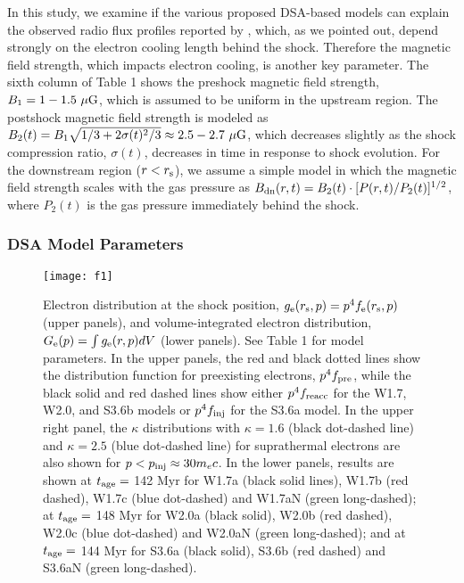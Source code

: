 \documentclass[twocolumn]{aastex61}
\def\muG{~{\mu\rm G}}
\begin{document}
In this study, we examine if the various proposed DSA-based models can explain the observed radio flux profiles reported by \citet{vanweeren16}, 
which, as we pointed out, depend strongly on the electron cooling length behind the shock. Therefore the magnetic field strength, which impacts electron cooling, is another key parameter.
The sixth column of Table 1 shows the preshock magnetic field strength, $B_1=1-1.5 \muG$,
which is assumed to be uniform in the upstream region.
The postshock magnetic field strength is modeled as $B_2(t)=B_1 \sqrt{1/3+2\sigma(t)^2/3}\approx 2.5-2.7\muG$,
which decreases slightly as the shock compression ratio, $\sigma(t)$, decreases in time in response to shock evolution.
For the downstream region ($r<r_{\rm s}$), we assume a simple model in which the magnetic field strength scales with the 
gas pressure as $B_{\rm dn}(r,t)= B_2(t) \cdot [P(r,t)/P_{2}(t)]^{1/2}$,
where $P_{2}(t)$ is the gas pressure immediately behind the shock.

\subsubsection{DSA Model Parameters}

\begin{figure*}[t]
\vspace{-0.4cm}
\hspace{-0.2cm}
\texttt{[image: f1]}
\vspace{-7.0cm}
\caption{
Electron distribution at the shock position, $g_{\rm e}(r_{\rm s},p)=p^4 f_{\rm e}(r_{\rm s},p)$ (upper panels),
and volume-integrated electron distribution, $G_{\rm e}(p)=\int g_{\rm e}(r,p)dV$ (lower panels). See Table 1 for model parameters.
In the upper panels, the red and black dotted lines show the distribution function for preexisting electrons, $p^4f_{\rm pre}$, 
while the black solid and red dashed lines show either $p^4 f_{\rm reacc}$ for the W1.7, W2.0, and S3.6b models or  $p^4 f_{\rm inj}$ for the S3.6a model.
In the upper right panel, the $\kappa$ distributions with $\kappa=1.6$ (black dot-dashed line) and 
$\kappa=2.5$ (blue dot-dashed line) for suprathermal electrons are also shown for $p<p_{\rm inj}\approx 30 m_ec$.
In the lower panels, results are shown at $t_{\rm age}=$ 142 Myr for W1.7a (black solid lines), W1.7b (red dashed), W1.7c (blue dot-dashed) 
and W1.7aN (green long-dashed);
at $t_{\rm age}=$ 148 Myr for W2.0a (black solid), W2.0b (red dashed), W2.0c (blue dot-dashed) 
and W2.0aN (green long-dashed);
and at $t_{\rm age}=$ 144 Myr for S3.6a (black solid), S3.6b (red dashed) and S3.6aN (green long-dashed).
}
\label{Fig1}
\end{figure*}
\end{document}
